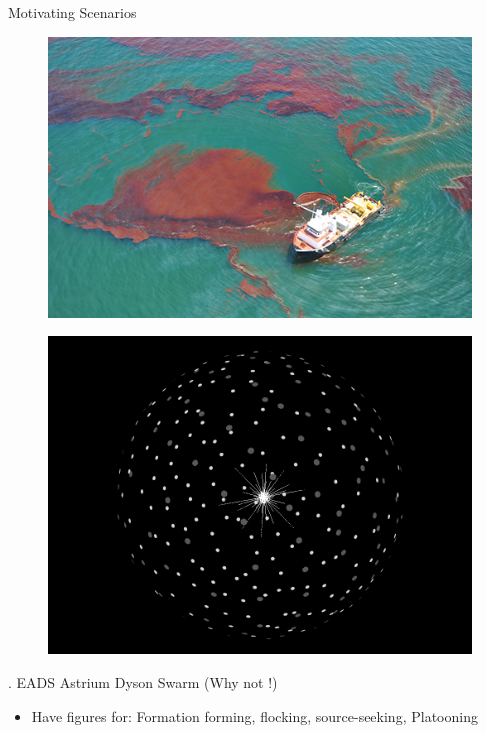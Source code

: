 \begin{frame}{Motivating Scenarios}
\begin{minipage}{0.45\textwidth}
\begin{figure}
		\end{figure}
	\end{minipage}
	\hspace{0.05cm}
	\begin{minipage}{0.45\textwidth}
		\begin{figure}
			\includegraphics[width=\textwidth]{figures/oil_spill.jpg}
		\end{figure}
		\begin{figure}
			\includegraphics[scale=0.1]{figures/Dyson_swarm.png}		
			\label{fig:Dyson_swarms}
		\end{figure}	
	\end{minipage} 
 .
 \hspace{0.5 cm}
  EADS Astrium 
\hspace{1.7 cm}
Dyson Swarm (Why not !)
\\
\vspace{0.5cm}
\begin{itemize}
	\item Have figures for: Formation forming, flocking, source-seeking, Platooning 
\end{itemize}
\end{frame}
